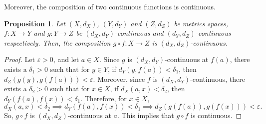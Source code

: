 \documentclass[a4paper, openany]{memoir}
\theoremstyle{definition}
\theoremstyle{plain}
\newtheorem{proposition}[definition]{Proposition}
\begin{document}
Moreover, the composition of two continuous functions is continuous.
\begin{proposition}
Let $(X, d_X)$, $(Y, d_Y)$ and $(Z, d_Z)$ be metrics spaces, $f: X \to Y$ and $g: Y \to Z$ be $(d_X, d_Y)$-continuous and $(d_Y, d_Z)$-continuous respectively. Then, the composition $g \circ f: X \to Z$ is $(d_X, d_Z)$-continuous.
\end{proposition}
\begin{proof}
Let $\varepsilon > 0$, and let $a \in X$. Since $g$ is $(d_X, d_Y)$-continuous at $f(a)$, there exists a $\delta_1 > 0$ such that for $y \in Y$, if $d_Y(y, f(a)) < \delta_1$, then $d_Z(g(y), g(f(a))) < \varepsilon$. Moreover, since $f$ is $(d_X, d_Y)$-continuous, there exists a $\delta_2 > 0$ such that for $x \in X$, if $d_X(a, x) < \delta_2$, then $d_Y(f(a), f(x)) < \delta_1$. Therefore, for $x \in X$,
\[d_X(a, x) < \delta_2 \implies d_Y(f(a), f(x)) < \delta_1 \implies d_Z(g(f(a)), g(f(x))) < \varepsilon.\]
So, $g \circ f$ is $(d_X, d_Z)$-continuous at $a$. This implies that $g \circ f$ is continuous.
\end{proof}
\end{document}
